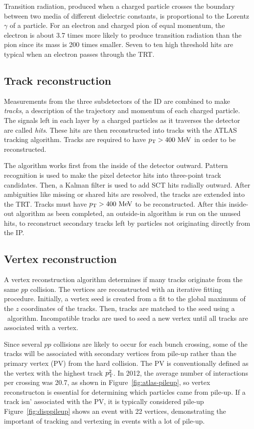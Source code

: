 Transition radiation, produced when a charged particle crosses the boundary between two media of different dielectric constants, is proportional to the Lorentz $\gamma$ of a particle. For an electron and charged pion of equal momentum, the electron is about 3.7 times more likely to produce transition radiation than the pion since its mass is 200 times smaller. Seven to ten high threshold hits are typical when an electron passes through the TRT. 


\subsection{Track reconstruction}
Measurements from the three subdetectors of the ID are combined to make \emph{tracks}, a description of the trajectory and momentum of each charged particle. The signals left in each layer by a charged particles as it traverses the detector are called \emph{hits}. These hits are then reconstructed into tracks with the ATLAS tracking algorithm\cite{ATLAS-CONF-2012-042}. Tracks are required to have $\pt > 400 \mev$ in order to be reconstructed.

The algorithm works first from the inside of the detector outward. Pattern recognition is used to make the pixel detector hits into three-point track candidates. Then, a Kalman filter is used to add SCT hits radially outward. After ambiguities like missing or shared hits are resolved, the tracks are extended into the TRT. Tracks must have $\pt > 400 \mev$ to be reconstructed. After this inside-out algorithm as been completed, an outside-in algorithm is run on the unused hits, to reconstruct secondary tracks left by particles not originating directly from the IP.



\subsection{Vertex reconstruction}
A vertex reconstruction algorithm determines if many tracks originate from the same $pp$ collision\cite{ATLAS-CONF-2010-069,ATLAS-CONF-2012-042}. The vertices are reconstructed with an iterative fitting procedure. Initially, a vertex seed is created from a fit to the global maximum of the $z$ coordinates of the tracks. Then, tracks are matched to the seed using a \chisq\ algorithm. Incompatible tracks are used to seed a new vertex until all tracks are associated with a vertex.

Since several $pp$ collisions are likely to occur for each bunch crossing, some of the tracks will be associated with secondary vertices from pile-up rather than the primary vertex (PV) from the hard collision. The PV is conventionally defined as the vertex with the highest track $p_{\text{T}}^2$. In 2012, the average number of interactions per crossing was 20.7, as shown in Figure~\ref{fig:atlas-pileup}, so vertex reconstructon is essential for determining which particles came from pile-up. If a track isn' associated with the PV, it is typically considered pile-up Figure~\ref{fig:disppileup} shows an event with 22 vertices, demonstrating the important of tracking and vertexing in events with a lot of pile-up.

